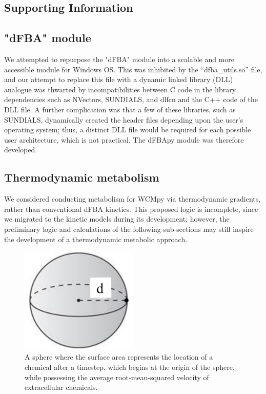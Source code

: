 
\begin{supplementary}

\section{Supporting Information}

\subsection{"dFBA" module}
We attempted to repurpose the "dFBA" module into a scalable and more accessible module for Windows OS. This was inhibited by the “dfba\_utils.so” file, and our attempt to replace this file with a dynamic linked library (DLL) analogue was thwarted by incompatibilities between C code in the library dependencies such as NVectors, SUNDIALS, and dlfcn and the C++ code of the DLL file. A further complication was that a few of these libraries, such as SUNDIALS, dynamically created the header files depending upon the user’s operating system; thus, a distinct DLL file would be required for each possible user architecture, which is not practical. The dFBApy module was therefore developed. 

\subsection{Thermodynamic metabolism}
We considered conducting metabolism for WCMpy via thermodynamic gradients, rather than conventional dFBA kinetics. This proposed logic is incomplete, since we migrated to the kinetic models during its development; however, the preliminary logic and calculations of the following sub-sections may still inspire the development of a thermodynamic metabolic approach.  


\begin{figure}
    \centering
    \includegraphics[width = 0.5\textwidth]{images/WCMpy/diffusion_sphere.png}
    \caption{
        A sphere where the surface area represents the location of a chemical after a timestep, which begins at the origin of the sphere, while possessing the average root-mean-squared velocity of extracellular chemicals.
    }
    \label{diffusion_sphere}
\end{figure}


\end{supplementary}
